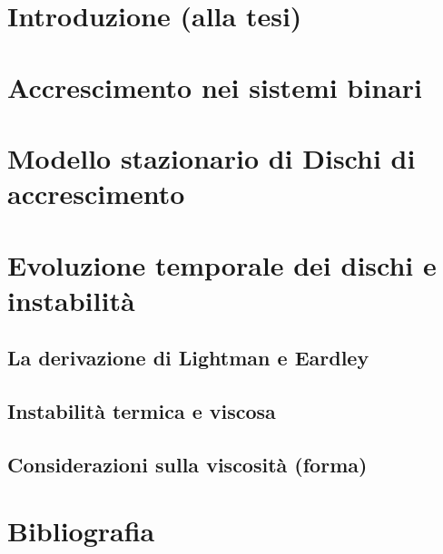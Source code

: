 \documentclass[a4paper]{article}
\begin{document}
\tableofcontents
\section{Introduzione (alla tesi)}
\section{Accrescimento nei sistemi binari}
\section{Modello stazionario di Dischi di accrescimento}
\section{Evoluzione temporale dei dischi e instabilità}
	\subsection{La derivazione di Lightman e Eardley}
	\subsection{Instabilità termica e viscosa}
	\subsection{Considerazioni sulla viscosità (forma)}
\section{Bibliografia}
\end{document}
